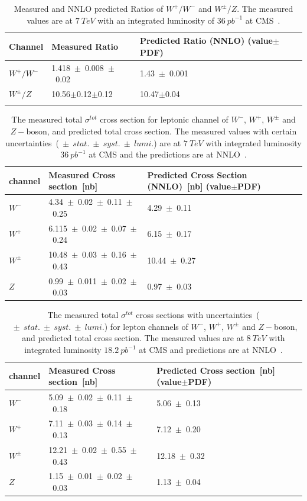 \begin{table}[H]
\caption{Measured and NNLO predicted Ratios of $W^{+}/W^{-}$ and $W^{\pm}/Z$. The measured values are at $7~TeV$ with an integrated luminosity of $36~pb^{-1}$ at CMS~\cite{2011}.}
\centering
\begin{tabular}{|l|p{6cm}|p{6cm}|}
\hline
Channel&\bf Measured Ratio&\bf Predicted Ratio (NNLO) (value$\pm$PDF)\\
\hline
\hline
$W^{+}/W^{-}$&1.418~$\pm$~0.008~$\pm$~0.02&1.43~$\pm$~0.001\\
$W^{\pm}/Z$&10.56$\pm$0.12$\pm$0.12&10.47$\pm$0.04\\
\hline
\label{7_1}
\end{tabular}

\end{table}

\begin{table}[H]
\caption{The measured total $\sigma^{tot}$ cross section for leptonic channel of $W^{-}$, $W^{+}$, $W^{\pm}$ and $Z-$boson, and predicted total cross section. The measured values with certain uncertainties~($~\pm~stat.~\pm~ syst.~\pm~ lumi.$) are at $7~TeV$ with integrated luminosity $36~pb^{-1}$ at CMS and the predictions are at NNLO~\cite{2011}.}
\centering
\begin{tabular}{|l|p{6cm}|p{6cm}|}
\hline
\bf channel&\bf Measured Cross section~[nb]&\bf Predicted Cross Section (NNLO)~[nb] (value$\pm$PDF)\\
\hline
\hline
$W^{-}$&4.34~$\pm$~0.02~$\pm$~0.11~$\pm$~0.25&4.29~$\pm$~0.11\\
$W^{+}$&6.115~$\pm$~0.02~$\pm$~0.07~$\pm$~0.24&6.15~$\pm$~0.17\\
$W^{\pm}$&10.48~$\pm$~0.03~$\pm$~0.16~$\pm$~0.43&10.44~$\pm$~0.27\\
\hline
\hline
$Z$&0.99~$\pm$~0.011~$\pm$~0.02~$\pm$~0.03&0.97~$\pm$~0.03\\
\hline
\end{tabular}
\label{7_2}
\end{table}


\begin{table}[H]
\caption{The measured total $\sigma^{tot}$ cross sections with uncertainties~($~\pm~ stat.~\pm~ syst.~\pm~ lumi.$) for lepton channels of $W^{-}$, $W^{+}$, $W^{\pm}$ and $Z-$boson, and predicted total cross section. The measured values are at $8~TeV$ with integrated luminosity $18.2~pb^{-1}$ at CMS and predictions are at NNLO~\cite{Chatrchyan_2014}.}
\centering
\begin{tabular}{|l|p{6cm}|p{6cm}|}
\hline
channel&\bf Measured Cross section~[nb]&\bf Predicted Cross section~[nb] (value$\pm$PDF)\\
\hline
\hline
$W^{-}$&5.09~$\pm$~0.02~$\pm$~0.11~$\pm$~0.18&5.06~$\pm$~0.13\\
$W^{+}$&7.11~$\pm$~0.03~$\pm$~0.14~$\pm$~0.13&7.12~$\pm$~0.20\\
$W^{\pm}$&12.21~$\pm$~0.02~$\pm$~0.55~$\pm$~0.43&12.18~$\pm$~0.32\\
\hline
\hline
$Z$&1.15~$\pm$~0.01~$\pm$~0.02~$\pm$~0.03&1.13~$\pm$~0.04\\
\hline
\end{tabular}
\label{8_1}
\end{table}

